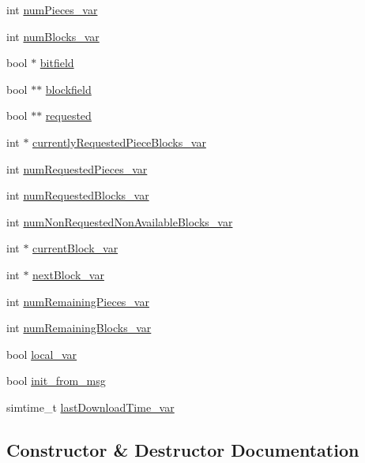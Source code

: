 \begin{DoxyCompactItemize}
\item 
int \hyperlink{classBitField_afefece68e8e5e1e4776d397eaf42380b}{num\+Pieces\+\_\+var}
\item 
int \hyperlink{classBitField_afa9fe0b1c09333b56a13a08a4c38ecde}{num\+Blocks\+\_\+var}
\item 
bool $\ast$ \hyperlink{classBitField_aa7d89d95390116a5858f58238e4ac70b}{bitfield}
\item 
bool $\ast$$\ast$ \hyperlink{classBitField_a118a658e23e172630dce6f02492d787f}{blockfield}
\item 
bool $\ast$$\ast$ \hyperlink{classBitField_a47a55c1562e21daa9c9712da2158800c}{requested}
\item 
int $\ast$ \hyperlink{classBitField_ad3cdde40d15e215ebf2872519bb9f70a}{currently\+Requested\+Piece\+Blocks\+\_\+var}
\item 
int \hyperlink{classBitField_a61c4e98def318eb51962e05277eda15b}{num\+Requested\+Pieces\+\_\+var}
\item 
int \hyperlink{classBitField_a9a421bd70a6585033d9780bf02914a37}{num\+Requested\+Blocks\+\_\+var}
\item 
int \hyperlink{classBitField_aa28ebc12ceb0bc128d26982fe6a109fc}{num\+Non\+Requested\+Non\+Available\+Blocks\+\_\+var}
\item 
int $\ast$ \hyperlink{classBitField_af0f28125e5efbfbf6ec38ad0bc9c9f6d}{current\+Block\+\_\+var}
\item 
int $\ast$ \hyperlink{classBitField_a9a444fae1b93310db9f3570efae32533}{next\+Block\+\_\+var}
\item 
int \hyperlink{classBitField_a2965edfff1a1a987020b18a5be8847d8}{num\+Remaining\+Pieces\+\_\+var}
\item 
int \hyperlink{classBitField_ae065179fd1f18ca75cd5dcc65b295c69}{num\+Remaining\+Blocks\+\_\+var}
\item 
bool \hyperlink{classBitField_ab199e8d887a5795c5eb2e25f47242848}{local\+\_\+var}
\item 
bool \hyperlink{classBitField_a750a21d8360389c5c1bbdd99cdeb11b1}{init\+\_\+from\+\_\+msg}
\item 
simtime\+\_\+t \hyperlink{classBitField_ab469de80cb93b832804f64679045d95e}{last\+Download\+Time\+\_\+var}
\end{DoxyCompactItemize}


\subsection{Constructor \& Destructor Documentation}
\hypertarget{classBitField_a1c2fa43c831330abdfcf561403e4702a}{}
